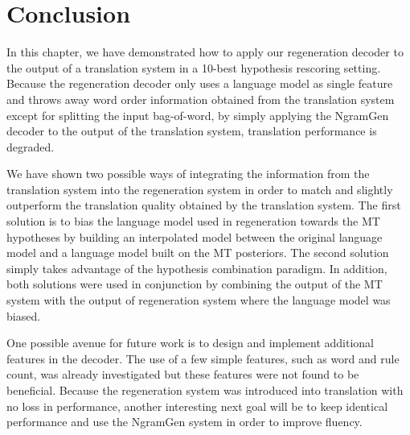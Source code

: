 \section{Conclusion}

In this chapter, we have demonstrated how to apply our regeneration
decoder to the output of a translation system in a 10-best hypothesis
rescoring setting. Because the regeneration decoder only uses
a language model as single feature and throws away word order
information obtained from the translation system except for splitting
the input bag-of-word, by simply
applying the NgramGen decoder to the output of the translation system, translation
performance is degraded.

We have shown two possible ways of integrating the information from the
translation system into the regeneration system in order to match
and slightly outperform the translation quality obtained by the
translation system. The first solution is to bias the language
model used in regeneration towards the MT hypotheses by building an interpolated
model between the original language model and a language model built on the MT
posteriors. The second
solution simply takes advantage of the hypothesis combination paradigm.
In addition, both solutions were used in conjunction by combining the output
of the MT system with the output of regeneration system where the language model
was biased.

One possible avenue for future work is to design and implement additional
features in the decoder. The use of a few simple features, such as word and rule count, was
already investigated but these features were not found to be beneficial.
Because the regeneration system was introduced into translation with no loss
in performance, another interesting next goal will be to keep identical performance
and use the NgramGen system in order to improve fluency.

